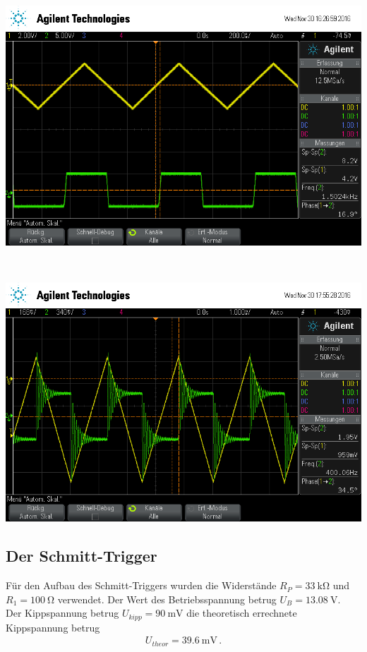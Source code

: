 \documentclass[]{scrartcl}
\begin{document}
\begin{minipage}[t]{0.5\textwidth}
	\includegraphics[width=\textwidth]{images/rechteck_diff}
	\label{fig:rechteckdiff}
\end{minipage} \\
\begin{minipage}[t]{0.5\textwidth}
	\includegraphics[width=\textwidth]{images/dreieck_diff}
	\label{fig:dreieckdiff}
\end{minipage} 

\subsection{Der Schmitt-Trigger}
Für den Aufbau des Schmitt-Triggers wurden die Widerstände $R_P=\SI{33}{\kilo\ohm}$ und $R_1=\SI{100}{\ohm}$ verwendet. Der Wert des Betriebsspannung betrug $U_B=\SI{13.08}{\volt}$. \\
Der Kippspannung betrug $U_{kipp}=\SI{90}{\milli\volt}$ die theoretisch errechnete Kippspannung betrug
\begin{align*}
U_{theor}=\SI{39.6}{\milli\volt}\,.
\end{align*}
\end{document}
